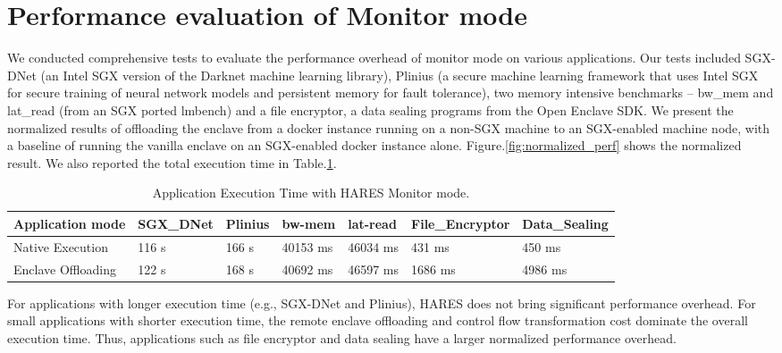 \documentclass[article, doublespace,nopageskip]{VTthesis} %
\newcommand{\monitor}{HARES }
\begin{document}
    \section{Performance evaluation of Monitor mode} \label{ase:performance evaluation of monitor mode}
    We conducted comprehensive tests to evaluate the performance overhead of monitor mode on various applications. Our tests included SGX-DNet (an Intel SGX version of the Darknet machine learning library), Plinius (a secure machine learning framework that uses Intel SGX for secure training of neural network models and persistent memory for fault tolerance), two memory intensive benchmarks – bw\_mem and lat\_read (from an SGX ported lmbench) and a file encryptor, a data sealing programs from the Open Enclave SDK. We present the normalized results of offloading the enclave from a docker instance running on a non-SGX machine to an SGX-enabled machine node, with a baseline of running the vanilla enclave on an SGX-enabled docker instance alone. Figure.\ref{fig:normalized_perf}  shows the normalized result. We also reported the total execution time in Table.\ref{tab:exe_time}.

    \begin{table}[t]
    \caption{Application Execution Time with \monitor Monitor mode.}
    \footnotesize
    \centering
    \begin{tabular}{|l|l|l|l|l|l|l|}
        \hline
        Application mode & SGX\_DNet & Plinius & bw-mem & lat-read & File\_Encryptor & Data\_Sealing \\ \hline
        Native Execution   & 116 s & 166 s   & 40153 ms & 46034 ms & 431 ms  & 450 ms      \\ \hline
        Enclave Offloading & 122 s & 168 s   & 40692 ms & 46597 ms & 1686 ms & 4986 ms     \\ \hline
    \end{tabular}
    \label{tab:exe_time}
    \end{table}

    For applications with longer execution time (e.g., SGX-DNet and Plinius), \monitor does not bring significant performance overhead. For small applications with shorter execution time, the remote enclave offloading and control flow transformation cost dominate the overall execution time. Thus, applications such as file encryptor and data sealing have a larger normalized performance overhead. 
\end{document}
